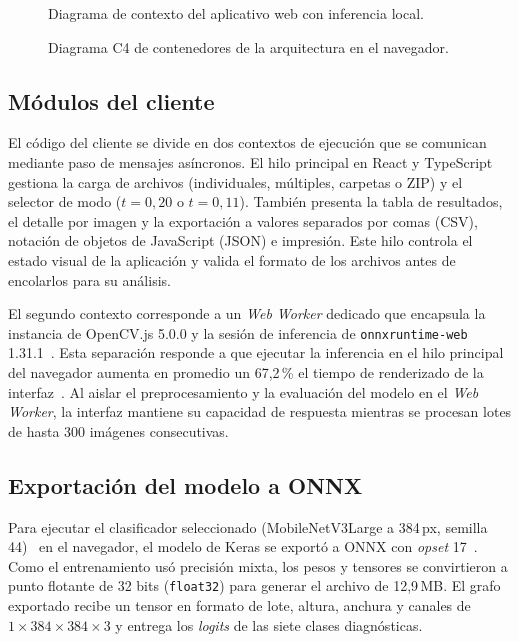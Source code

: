 \begin{figure}[H]
  \centering
  \caption{Diagrama de contexto del aplicativo web con inferencia local.}
  \label{fig:contexto}
\end{figure}

\begin{figure}[H]
  \centering
  \caption{Diagrama C4 de contenedores de la arquitectura en el navegador.}
  \label{fig:c4-contenedores}
\end{figure}

\subsection{Módulos del cliente}

El código del cliente se divide en dos contextos de ejecución que se comunican mediante paso de mensajes asíncronos. El hilo principal en React y TypeScript gestiona la carga de archivos (individuales, múltiples, carpetas o ZIP) y el selector de modo ($t = 0{,}20$ o $t = 0{,}11$). También presenta la tabla de resultados, el detalle por imagen y la exportación a valores separados por comas (CSV), notación de objetos de JavaScript (JSON) e impresión. Este hilo controla el estado visual de la aplicación y valida el formato de los archivos antes de encolarlos para su análisis.

El segundo contexto corresponde a un \textit{Web Worker} dedicado que encapsula la instancia de OpenCV.js 5.0.0 y la sesión de inferencia de \texttt{onnxruntime-web} 1.31.1~\cite{ning2024onnxweb}. Esta separación responde a que ejecutar la inferencia en el hilo principal del navegador aumenta en promedio un 67,2\,\% el tiempo de renderizado de la interfaz~\cite{wang2025browser}. Al aislar el preprocesamiento y la evaluación del modelo en el \textit{Web Worker}, la interfaz mantiene su capacidad de respuesta mientras se procesan lotes de hasta 300 imágenes consecutivas.

\subsection{Exportación del modelo a ONNX}

Para ejecutar el clasificador seleccionado (MobileNetV3Large a 384\,px, semilla 44)~\cite{howard2019mobilenetv3} en el navegador, el modelo de Keras se exportó a ONNX con \textit{opset} 17~\cite{ning2024onnxweb}. Como el entrenamiento usó precisión mixta, los pesos y tensores se convirtieron a punto flotante de 32 bits (\texttt{float32}) para generar el archivo de 12,9\,MB. El grafo exportado recibe un tensor en formato de lote, altura, anchura y canales de $1 \times 384 \times 384 \times 3$ y entrega los \textit{logits} de las siete clases diagnósticas.

